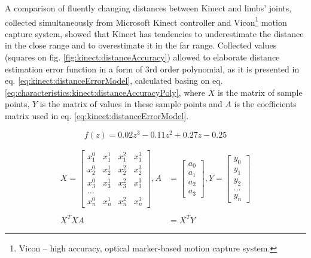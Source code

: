 \documentclass[sensors,article,submit,moreauthors,pdftex,10pt,a4paper]{mdpi}
\begin{document}
A comparison of fluently changing distances between Kinect and limbs' joints, collected simultaneously from Microsoft Kinect controller and Vicon\footnote{Vicon -- high accuracy, optical marker-based motion capture system.} motion capture system, showed that Kinect has tendencies to underestimate the distance in the close range and to overestimate it in the far range. Collected values (squares on fig. \ref{fig:kinect:distanceAccuracy}) allowed to elaborate distance estimation error function in a form of 3rd order polynomial, as it is presented in eq. \ref{eq:kinect:distanceErrorModel}, calculated basing on eq. \ref{eq:characteristics:kinect:distanceAccuracyPoly}, where $X$ is the matrix of sample points, $Y$ is the matrix of values in these sample points and $A$ is the coefficients matrix used in eq. \ref{eq:kinect:distanceErrorModel}. 

\begin{equation}
	f(z)=0.02z^3-0.11z^2+0.27z-0.25 
	\label{eq:kinect:distanceErrorModel}
\end{equation}

\begin{equation}
\begin{split}
X = 	\begin{bmatrix}
x_1^0&x_1^1&x_1^2&x_1^3\\
x_2^0&x_2^1&x_2^2&x_2^3\\
x_3^0&x_3^1&x_3^2&x_3^3\\
\dots\\
x_n^0&x_n^1&x_n^2&x_n^3
\end{bmatrix} ,
A &= 	\begin{bmatrix}
a_0\\a_1\\a_2\\a_3
\end{bmatrix} ,
Y = 
\begin{bmatrix}
y_0 \\y_1\\y_2\\\dots\\y_n
\end{bmatrix} \\
& \\
X^TXA &= X^TY
\end{split}
\label{eq:characteristics:kinect:distanceAccuracyPoly}
\end{equation}
\end{document}
